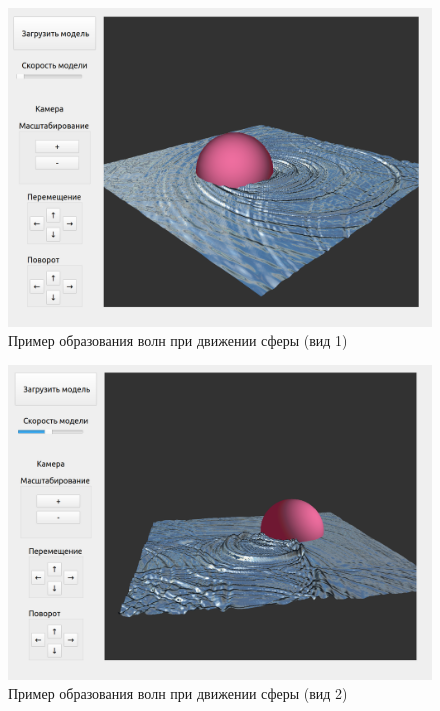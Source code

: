 \begin{figure}[H]
	\begin{center}
		\includegraphics[scale=0.25]{img/example-first.png}
	\end{center}
	\captionsetup{justification=centering}
	\caption{Пример образования волн при движении сферы (вид 1)}
	\label{img:example-first}
\end{figure}

\begin{figure}[H]
	\begin{center}
		\includegraphics[scale=0.25]{img/example-second.png}
	\end{center}
	\captionsetup{justification=centering}
	\caption{Пример образования волн при движении сферы (вид 2)}
	\label{img:example-second}
\end{figure}

